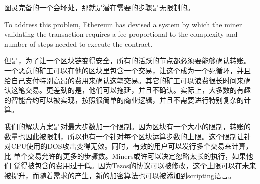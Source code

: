 \documentclass[letterpaper]{article}
\begin{document}
图灵完备的一个会坏处，那就是潜在需要的步骤是无限制的。

To address this problem, Ethereum has devised a system by which the miner
validating the transaction requires a fee proportional to the complexity
and number of steps needed to execute the contract.

但是，为了让一个区块链变得安全，所有的活跃的节点都必须要能够确认转账。
一个恶意的矿工可以在他的区块里包含一个交易，让这个成为一个死循环，并且
给自己支付特别高昂的费用来确认这笔交易。其它的矿工可以浪费很长时间来确
认这笔交易。更差劲的是，他们可以拖延，并且不确认。实际上，大多数的有趣
的智能合约可以被实现，按照很简单的商业逻辑，并且不需要进行特别复杂的计
算。

我们的解决方案是对最大步数加一个限制。因为区块有一个大小的限制，转账的
数量也因此被限制，所以也有一个针对每个区块运算步数的上限。这个限制让针
对CPU使用的DOS攻击变得无效。同时，有效的用户可以发行多个交易来计算，比
单个交易允许的更多的步骤数。Miners或许可以决定忽略太长的执行，如果他们
觉得被包含的费用过于低。因为Tezos的协议可以被修改，这个上限可以在未来
被提升，而随着需求的产生，新的加密算法也可以被添加到scripting语言。
\end{document}
